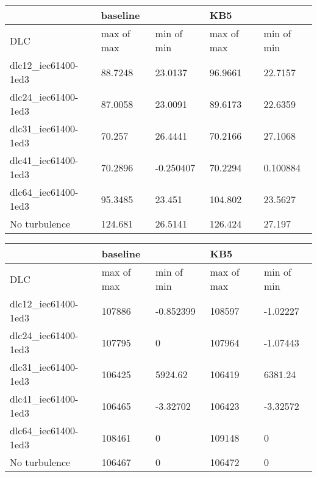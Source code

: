 \begin{tabular}{lllll}
\toprule
                     & \multicolumn{2}{l}{baseline} &         KB5 &\\
\midrule
                 DLC &  max of max &  min of min &  max of max &  min of min \\
 dlc12\_iec61400-1ed3 &     88.7248 &     23.0137 &     96.9661 &     22.7157 \\
 dlc24\_iec61400-1ed3 &     87.0058 &     23.0091 &     89.6173 &     22.6359 \\
 dlc31\_iec61400-1ed3 &      70.257 &     26.4441 &     70.2166 &     27.1068 \\
 dlc41\_iec61400-1ed3 &     70.2896 &   -0.250407 &     70.2294 &    0.100884 \\
 dlc64\_iec61400-1ed3 &     95.3485 &      23.451 &     104.802 &     23.5627 \\
    No turbulence &     124.681 &     26.5141 &     126.424 &      27.197 \\
\bottomrule
\end{tabular}


\begin{tabular}{lllll}
\toprule
                     & \multicolumn{2}{l}{baseline} &         KB5 &\\
\midrule
                 DLC &  max of max &  min of min &  max of max &  min of min \\
 dlc12\_iec61400-1ed3 &      107886 &   -0.852399 &      108597 &    -1.02227 \\
 dlc24\_iec61400-1ed3 &      107795 &           0 &      107964 &    -1.07443 \\
 dlc31\_iec61400-1ed3 &      106425 &     5924.62 &      106419 &     6381.24 \\
 dlc41\_iec61400-1ed3 &      106465 &    -3.32702 &      106423 &    -3.32572 \\
 dlc64\_iec61400-1ed3 &      108461 &           0 &      109148 &           0 \\
    No turbulence &      106467 &           0 &      106472 &           0 \\
\bottomrule
\end{tabular}

\clearpage


